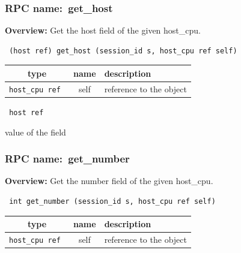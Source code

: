 \subsubsection{RPC name:~get\_host}

{\bf Overview:} 
Get the host field of the given host\_cpu.

\begin{verbatim} (host ref) get_host (session_id s, host_cpu ref self)\end{verbatim}



 
\vspace{0.3cm}
\begin{tabular}{|c|c|p{7cm}|}
 \hline
{\bf type} & {\bf name} & {\bf description} \\ \hline
{\tt host\_cpu ref } & self & reference to the object \\ \hline 

\end{tabular}

\vspace{0.3cm}

{\tt 
host ref
}


value of the field
\vspace{0.3cm}
\vspace{0.3cm}
\vspace{0.3cm}
\subsubsection{RPC name:~get\_number}

{\bf Overview:} 
Get the number field of the given host\_cpu.

\begin{verbatim} int get_number (session_id s, host_cpu ref self)\end{verbatim}



 
\vspace{0.3cm}
\begin{tabular}{|c|c|p{7cm}|}
 \hline
{\bf type} & {\bf name} & {\bf description} \\ \hline
{\tt host\_cpu ref } & self & reference to the object \\ \hline 

\end{tabular}

\vspace{0.3cm}

